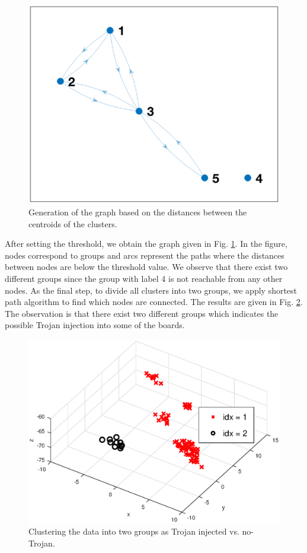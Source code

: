 \documentclass[journal]{IEEEtran}
\begin{document}
\begin{figure}[ht]
	\centering
	\includegraphics[trim=0.0in 0.0in 0.0in 0.0in,clip=true,width=\linewidth]{figure/graphPlot.eps}
	\caption{Generation of the graph based on the distances between the centroids of the clusters.}
	\label{fig:graph}
\end{figure}

After setting the threshold, we obtain the graph given in Fig. \ref{fig:graph}. In the figure, nodes correspond to groups and arcs represent the paths where the distances between nodes are below the threshold value. We observe that there exist two different groups since the group with label 4 is not reachable from any other nodes. As the final step, to divide all clusters into two groups, we apply shortest path algorithm to find which nodes are connected. The results are given in Fig. \ref{fig:clusters}. The observation is that there exist  two different groups which indicates the possible Trojan injection into some of the boards. 

\begin{figure}[ht]
	\centering
	\includegraphics[trim=0.0in 0.0in 0.0in 0.0in,clip=true,width=\linewidth]{figure/clusteringResult.eps}
	\caption{Clustering the data into two groups as Trojan injected vs. no-Trojan.}
	\label{fig:clusters}
\end{figure}
\end{document}
